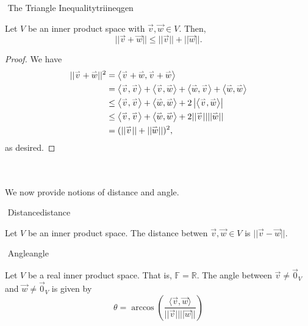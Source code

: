         \begin{theorem}{\Stop\,\,The Triangle Inequality}{triineqgen}

            Let \(V\) be an inner product space with \(\vec{v},\vec{w}\in V\). Then,
            \begin{equation*}
                ||\vec{v}+\vec{w}||\leq||\vec{v}||+||\vec{w}||.
            \end{equation*}
            \begin{proof}
                We have
                \begin{align*}
                    ||\vec{v}+\vec{w}||^2&=\iprod{\vec{v}+\vec{w}}{\vec{v}+\vec{w}} \\
                    &=\iprod{\vec{v}}{\vec{v}}+\iprod{\vec{v}}{\vec{w}}+\iprod{\vec{w}}{\vec{v}}+\iprod{\vec{w}}{\vec{w}} \\
                    &\leq\iprod{\vec{v}}{\vec{v}}+\iprod{\vec{w}}{\vec{w}}+2\left|\iprod{\vec{v}}{\vec{w}}\right| \\
                    &\leq\iprod{\vec{v}}{\vec{v}}+\iprod{\vec{w}}{\vec{w}}+2||\vec{v}||||\vec{w}|| \\
                    &=(||\vec{v}||+||\vec{w}||)^2,
                \end{align*}
                as desired.
            \end{proof}

        \end{theorem}
        \vphantom
        \\
        \\
        We now provide notions of distance and angle.
        \begin{definition}{\Stop\,\,Distance}{distance}

            Let \(V\) be an inner product space. The distance betwen \(\vec{v},\vec{w}\in V\) is \(||\vec{v}-\vec{w}||\).
            
        \end{definition}
        \begin{definition}{\Stop\,\,Angle}{angle}

            Let \(V\) be a real inner product space. That is, \(\mathbb{F}=\mathbb{R}\). The angle between \(\vec{v}\neq\vec{0}_V\) and \(\vec{w}\neq\vec{0}_V\) is given by
            \begin{equation*}
                \theta =\arccos\left(\frac{\langle\vec{v},\vec{w}\rangle}{||\vec{v}||||\vec{w}||}\right)
            \end{equation*}
            
        \end{definition}
